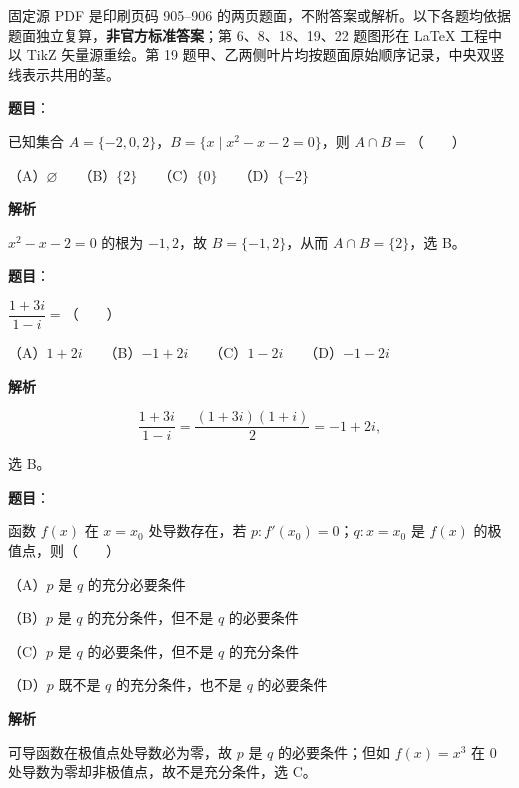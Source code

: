 

\begin{gktip}
固定源 PDF 是印刷页码 905–906 的两页题面，不附答案或解析。以下各题均依据题面独立复算，\textbf{非官方标准答案}；第 6、8、18、19、22 题图形在 LaTeX 工程中以 TikZ 矢量源重绘。第 19 题甲、乙两侧叶片均按题面原始顺序记录，中央双竖线表示共用的茎。
\end{gktip}


\begin{answer}

\textbf{题目}：

已知集合 $A=\{-2,0,2\}$，$B=\{x\mid x^2-x-2=0\}$，则 $A\cap B=$\mbox{（　　）}

（A）$\varnothing$　　（B）$\{2\}$　　（C）$\{0\}$　　（D）$\{-2\}$

\textbf{解析}

$x^2-x-2=0$ 的根为 $-1,2$，故 $B=\{-1,2\}$，从而 $A\cap B=\{2\}$，选 B。


\end{answer}
\begin{answer}

\textbf{题目}：

$\dfrac{1+3i}{1-i}=$\mbox{（　　）}

（A）$1+2i$　　（B）$-1+2i$　　（C）$1-2i$　　（D）$-1-2i$

\textbf{解析}

\nopagebreak[4]
\[
\frac{1+3i}{1-i}=\frac{(1+3i)(1+i)}2=-1+2i,
\]

选 B。


\end{answer}
\begin{answer}

\textbf{题目}：

函数 $f(x)$ 在 $x=x_0$ 处导数存在，若 $p:f'(x_0)=0$；$q:x=x_0$ 是 $f(x)$ 的极值点，则\mbox{（　　）}

（A）$p$ 是 $q$ 的充分必要条件

（B）$p$ 是 $q$ 的充分条件，但不是 $q$ 的必要条件

（C）$p$ 是 $q$ 的必要条件，但不是 $q$ 的充分条件

（D）$p$ 既不是 $q$ 的充分条件，也不是 $q$ 的必要条件

\textbf{解析}

可导函数在极值点处导数必为零，故 $p$ 是 $q$ 的必要条件；但如 $f(x)=x^3$ 在 $0$ 处导数为零却非极值点，故不是充分条件，选 C。


\end{answer}
